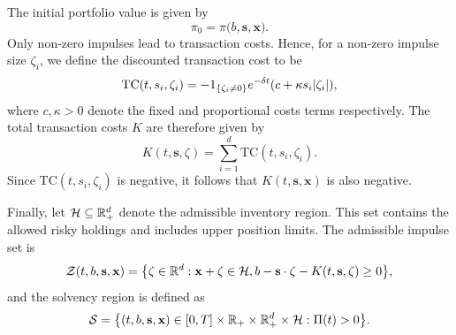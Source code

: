 The initial portfolio value is given by
\begin{equation}
    \pi_0 = \pi \big(b, \mathbf{s}, \mathbf{x}\big). 
    \label{eqn: initial portfolio function}
\end{equation}
Only non-zero impulses lead to transaction costs. Hence, for a non-zero impulse size $\zeta_i$, we define the discounted transaction cost to be
\begin{equation*}
    \text{TC}(t,s_i,\zeta_i) = -1_{\left\{\zeta_i\neq0\right\}} e^{-\delta t}(c + \kappa s_i |\zeta_i|),
\end{equation*}
where $c,\kappa>0$ denote the fixed and proportional costs terms respectively. The total transaction costs $K$ are therefore given by 
\begin{equation*}
    K(t,\mathbf{s}, \zeta) = \sum_{i=1}^d \text{TC}(t,s_i,\zeta_i).
\end{equation*}
Since $\text{TC}(t,s_i,\zeta_i)$ is negative, it follows that $K(t,\mathbf{s}, \mathbf x)$ is also negative. 

Finally, let $\mathcal H \subseteq \mathbb{R}_+^d$ denote the admissible inventory region. This set contains the allowed risky holdings and includes upper position limits. The admissible impulse set is 
\begin{equation}
    \mathcal{Z}(t, b, \mathbf s, \mathbf x) = \big\{ \zeta \in \mathbb{R}^d: \mathbf{x} + \zeta \in \mathcal H, b - \mathbf{s}\cdot\zeta - K(t,\mathbf s, \zeta) \geq 0 \big\},
\end{equation}
and the solvency region is defined as
\begin{equation*}
    \mathcal{S} = \big\{ (t,b,\mathbf s, \mathbf x) \in [0,T] \times \mathbb{R}_+ \times \mathbb{R}_+^d \times \mathcal H: \Pi(t)>0 \big\}. 
\end{equation*}

